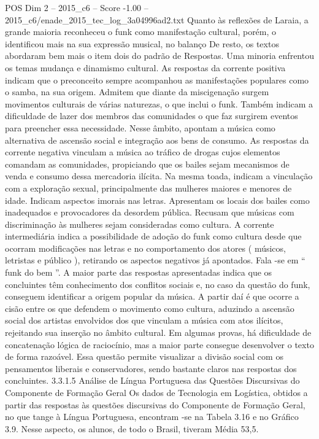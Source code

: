 \begin{textsample}{POS Dim 2 – 2015\_c6 – Score -1.00 – 2015\_c6/enade\_2015\_tec\_log\_3a04996ad2.txt}
Quanto às reflexões de Laraia, a grande maioria reconheceu o funk como manifestação cultural, porém, o identificou mais na sua expressão musical, no balanço De resto, os textos abordaram bem mais o item dois do padrão de Respostas.
Uma minoria enfrentou os temas mudança e dinamismo cultural.
As respostas da corrente positiva indicam que o preconceito sempre acompanhou as manifestações populares como o samba, na sua origem.
Admitem que diante da miscigenação surgem movimentos culturais de várias naturezas, o que inclui o funk.
Também indicam a dificuldade de lazer dos membros das comunidades o que faz surgirem eventos para preencher essa necessidade.
Nesse âmbito, apontam a música como alternativa de ascensão social e integração aos bens de consumo.
As respostas da corrente negativa vinculam a música ao tráfico de drogas cujos elementos comandam as comunidades, propiciando que os bailes sejam mecanismos de venda e consumo dessa mercadoria ilícita.
Na mesma toada, indicam a vinculação com a exploração sexual, principalmente das mulheres maiores e menores de idade.
Indicam aspectos imorais nas letras.
Apresentam os locais dos bailes como inadequados e provocadores da desordem pública.
Recusam que músicas com discriminação às mulheres sejam consideradas como cultura.
A corrente intermediária indica a possibilidade de adoção do funk como cultura desde que ocorram modificações nas letras e no comportamento dos atores ( músicos, letristas e público ), retirando os aspectos negativos já apontados.
Fala -se em “ funk do bem ”.
A maior parte das respostas apresentadas indica que os concluintes têm conhecimento dos conflitos sociais e, no caso da questão do funk, conseguem identificar a origem popular da música.
A partir daí é que ocorre a cisão entre os que defendem o movimento como cultura, aduzindo a ascensão social dos artistas envolvidos dos que vinculam a música com atos ilícitos, rejeitando sua inserção no âmbito cultural.
Em algumas provas, há dificuldade de concatenação lógica de raciocínio, mas a maior parte consegue desenvolver o texto de forma razoável.
Essa questão permite visualizar a divisão social com os pensamentos liberais e conservadores, sendo bastante claros nas respostas dos concluintes. 3.3.1.5 Análise de Língua Portuguesa das Questões Discursivas do Componente de Formação Geral Os dados de Tecnologia em Logística, obtidos a partir das respostas às questões discursivas do Componente de Formação Geral, no que tange à Língua Portuguesa, encontram -se na Tabela 3.16 e no Gráfico 3.9.
Nesse aspecto, os alunos, de todo o Brasil, tiveram Média 53,5.

\end{textsample}
